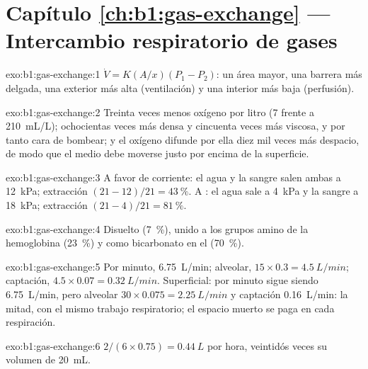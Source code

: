 \section*{Capítulo \ref{ch:b1:gas-exchange} --- Intercambio respiratorio de gases}

\begin{solution}{exo:b1:gas-exchange:1}
$\dot V = K(A/x)(P_1 - P_2)$: un área mayor, una barrera más delgada, una
 exterior más alta (ventilación) y una interior más baja
(perfusión).
\end{solution}

\begin{solution}{exo:b1:gas-exchange:2}
Treinta veces menos oxígeno por litro (\qty{7}{} frente a \qty{210}{mL/L});
ochocientas veces más densa y cincuenta veces más viscosa, y por tanto cara
de bombear; y el oxígeno difunde por ella diez mil veces más despacio, de
modo que el medio debe moverse justo por encima de la superficie.
\end{solution}

\begin{solution}{exo:b1:gas-exchange:3}
A favor de corriente: el agua y la sangre salen ambas a \qty{12}{kPa};
extracción $(21 - 12)/21 = \qty{43}{\%}$. A : el agua sale a
\qty{4}{kPa} y la sangre a \qty{18}{kPa}; extracción $(21 - 4)/21 =
\qty{81}{\%}$.
\end{solution}

\begin{solution}{exo:b1:gas-exchange:4}
Disuelto (\qty{7}{\%}), unido a los grupos amino de la hemoglobina
(\qty{23}{\%}) y como bicarbonato en el  (\qty{70}{\%}).
\end{solution}

\begin{solution}{exo:b1:gas-exchange:5}
Por minuto, \qty{6.75}{L/min}; alveolar, $15\times 0.3 = \qty{4.5}{L/min}$;
captación, $4.5\times 0.07 = \qty{0.32}{L/min}$. Superficial: por minuto
sigue siendo \qty{6.75}{L/min}, pero alveolar $30\times 0.075 =
\qty{2.25}{L/min}$ y captación \qty{0.16}{L/min}: la mitad, con el mismo
trabajo respiratorio; el espacio muerto se paga en cada respiración.
\end{solution}

\begin{solution}{exo:b1:gas-exchange:6}
$2/(6\times 0.75) = \qty{0.44}{L}$ por hora, veintidós veces su volumen de
\qty{20}{mL}.
\end{solution}

